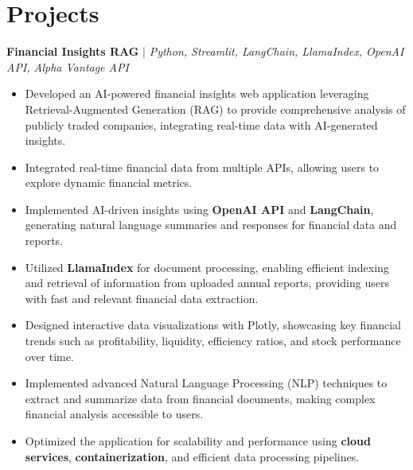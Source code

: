 \section*{Projects}

\textbf{Financial Insights RAG} | \textit{Python, Streamlit, LangChain, LlamaIndex, OpenAI API, Alpha Vantage API}
\begin{itemize}
    \item Developed an AI-powered financial insights web application leveraging Retrieval-Augmented Generation (RAG) to provide comprehensive analysis of publicly traded companies, integrating real-time data with AI-generated insights.
    \item Integrated real-time financial data from multiple APIs, allowing users to explore dynamic financial metrics.
    \item Implemented AI-driven insights using \textbf{OpenAI API} and \textbf{LangChain}, generating natural language summaries and responses for financial data and reports.
    \item Utilized \textbf{LlamaIndex} for document processing, enabling efficient indexing and retrieval of information from uploaded annual reports, providing users with fast and relevant financial data extraction.
    \item Designed interactive data visualizations with Plotly, showcasing key financial trends such as profitability, liquidity, efficiency ratios, and stock performance over time.
    \item Implemented advanced Natural Language Processing (NLP) techniques to extract and summarize data from financial documents, making complex financial analysis accessible to users.
    \item Optimized the application for scalability and performance using \textbf{cloud services}, \textbf{containerization}, and efficient data processing pipelines.
\end{itemize}

